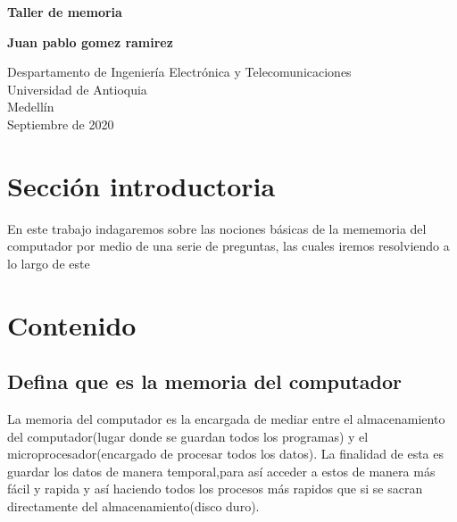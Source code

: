 \documentclass{article}
\begin{document}
\begin{titlepage}
    \begin{center}
        \vspace*{1cm}
            
        \Huge
        \textbf{Taller de memoria}
            
        \vspace{0.5cm}
        \LARGE
        
            
        \vspace{1.5cm}
            
        \textbf{Juan pablo gomez ramirez} 
            
        \vfill
            
        \vspace{0.8cm}
            
        \Large
        Despartamento de Ingeniería Electrónica y Telecomunicaciones\\
        Universidad de Antioquia\\
        Medellín\\
        Septiembre de 2020
            
    \end{center}
\end{titlepage}

\tableofcontents
\newpage
\section{Sección introductoria}\label{intro}
En este trabajo indagaremos sobre las nociones básicas de la mememoria del computador por medio de una serie de preguntas, las cuales iremos resolviendo a lo largo de este
\section{Contenido} \label{contenido}

\subsection{Defina que es la memoria del computador}
La memoria del computador es la encargada de mediar entre el almacenamiento del computador(lugar donde se guardan todos los programas) y el microprocesador(encargado de procesar todos los datos).
La finalidad de esta es guardar los datos de manera temporal,para así acceder a  estos de manera más fácil y rapida y así haciendo todos los procesos más rapidos que si se sacran directamente del almacenamiento(disco duro).
\end{document}
